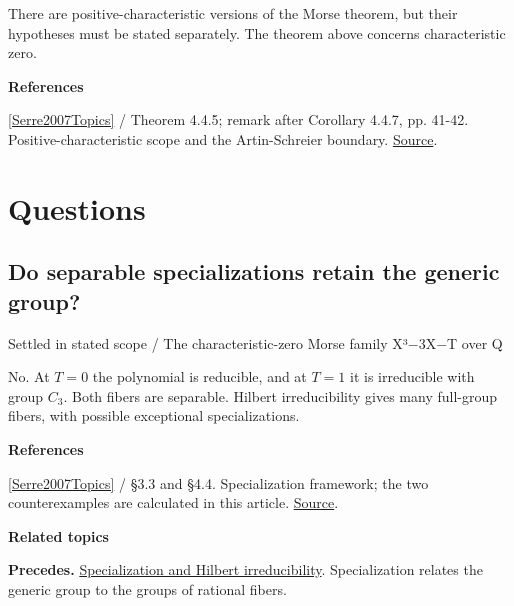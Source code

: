 \documentclass[11pt,a4paper,oneside,openany]{book}
\newenvironment{sources}{\par\smallskip\begingroup\footnotesize\color{atlasgray}\leftskip=10pt\setlength{\parskip}{2pt}}{\par\endgroup\smallskip}
\begin{document}
\color{black} There are positive-characteristic versions of the Morse theorem, but their hypotheses must be stated separately. The theorem above concerns characteristic zero.\par
\begin{sources}
\textbf{References}\par\smallskip
\noindent\hyperlink{ref:Serre2007Topics}{[Serre2007Topics]} / Theorem 4.4.5; remark after Corollary 4.4.7, pp. 41-42. Positive-characteristic scope and the Artin-Schreier boundary. \href{https://www.routledge.com/Topics-in-Galois-Theory-2nd-Edition/Serre/p/book/9780429064401}{Source}.\par
\end{sources}\color{black}
\section*{Questions}
\subsection*{Do separable specializations retain the generic group?}
{\small\sffamily\color{atlasgold}Settled in stated scope / The characteristic-zero Morse family X³\ensuremath{-}3X\ensuremath{-}T over Q}\par\smallskip
\color{black} No. At \(T=0\) the polynomial is reducible, and at \(T=1\) it is irreducible with group \(C_3\). Both fibers are separable. Hilbert irreducibility gives many full-group fibers, with possible exceptional specializations.\par
\begin{sources}
\textbf{References}\par\smallskip
\noindent\hyperlink{ref:Serre2007Topics}{[Serre2007Topics]} / §3.3 and §4.4. Specialization framework; the two counterexamples are calculated in this article. \href{https://www.routledge.com/Topics-in-Galois-Theory-2nd-Edition/Serre/p/book/9780429064401}{Source}.\par
\end{sources}\color{black}
\par\medskip\begingroup\footnotesize\setlength{\parskip}{1pt}\textbf{\sffamily\color{atlasgreen}Related topics}\par
\color{black}\textbf{Precedes.} \hyperlink{article:specialization}{Specialization and Hilbert irreducibility}. Specialization relates the generic group to the groups of rational fibers.\par
\end{document}
